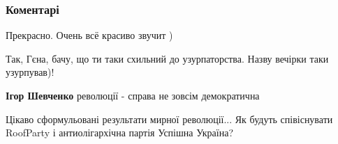  
 
 
 
 
\subsubsection{Коментарі}
\label{sec:05_09_2021.fb.druzenko_gennadiy.1.revolution_on_human_scale.cmt}

\begin{itemize}
 
Прекрасно. Очень всё красиво звучит )

 

Так, Гєна, бачу, що ти таки схильний до узурпаторства. Назву вечірки таки узурпував)!

\begin{itemize}
 
\textbf{Ігор Шевченко} революції - справа не зовсім демократична \Smiley[1.0][yellow]
\end{itemize}

 
Цікаво сформульовані результати мирної революції... Як будуть співіснувати RoofParty і антиолігархічна партія Успішна Україна?🤔


\end{itemize}
